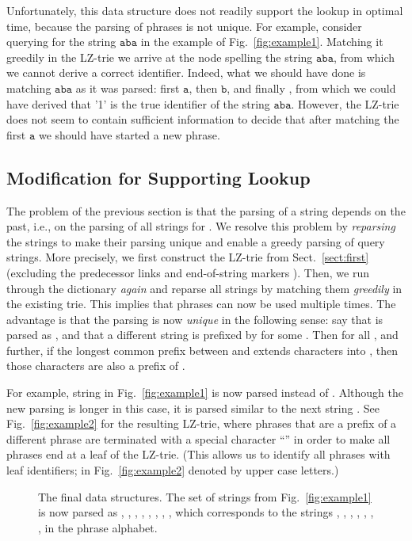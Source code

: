 \documentclass{llncs}
\newcommand{\str}[1]{\ensuremath{\texttt{#1}}}
\begin{document}
Unfortunately, this data structure does not readily support the lookup in optimal  time, because the parsing of phrases is not unique. For example, consider querying for the string \str{aba} in the example of Fig.\ \ref{fig:example1}. Matching it greedily in the LZ-trie we arrive at the node spelling the string \str{aba}, from which we cannot derive a correct identifier. Indeed, what we should have done is matching \str{aba} as it was parsed: first \str{a}, then \str{b}, and finally , from which we could have derived that '1' is the true identifier of the string \str{aba}. However, the LZ-trie does not seem to contain sufficient information to decide that after matching the first \str{a} we should have started a new phrase.

\subsection{Modification for Supporting Lookup}
\label{sect:second}
The problem of the previous section is that the parsing of a string  depends on the past, i.e., on the parsing of all strings  for .
We resolve this problem by \emph{reparsing} the strings to make their parsing unique and enable a greedy parsing of query strings. More precisely, we first construct the LZ-trie from Sect.~\ref{sect:first} (excluding the predecessor links and end-of-string markers ). Then, we run through the dictionary  \emph{again} and reparse all strings by matching them \emph{greedily} in the existing trie. This implies that phrases can now be used multiple times. The advantage is that the parsing is now \emph{unique} in the following sense: say that  is parsed as , and that a different string  is prefixed by  for some . Then  for all , and further, if the longest common prefix between  and  extends  characters into , then those  characters are also a prefix of .

For example, string  in Fig.~\ref{fig:example1} is now parsed  instead of . Although the new parsing is longer in this case, it is parsed similar to the next string . See Fig.~\ref{fig:example2} for the resulting LZ-trie, where phrases that are a prefix of a different phrase are terminated with a special character ``'' in order to make all phrases end at a leaf of the LZ-trie. (This allows us to identify all phrases with leaf identifiers; in Fig.~\ref{fig:example2} denoted by upper case letters.)

\begin{figure}[t]
  \centering
  \hfill
  \caption{The final data structures. The set of strings from Fig.~\ref{fig:example1} is now parsed as , , , , , , , , which corresponds to the strings , , , , , , ,  in the phrase alphabet.}
  \label{fig:final}
\end{figure}
\end{document}
